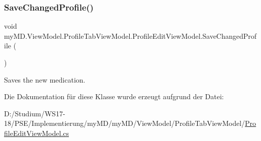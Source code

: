 \subsubsection{\texorpdfstring{Save\+Changed\+Profile()}{SaveChangedProfile()}}
{\footnotesize\ttfamily void my\+M\+D.\+View\+Model.\+Profile\+Tab\+View\+Model.\+Profile\+Edit\+View\+Model.\+Save\+Changed\+Profile (\begin{DoxyParamCaption}{ }\end{DoxyParamCaption})}



Saves the new medication. 



Die Dokumentation für diese Klasse wurde erzeugt aufgrund der Datei\+:\begin{DoxyCompactItemize}
\item 
D\+:/\+Studium/\+W\+S17-\/18/\+P\+S\+E/\+Implementierung/my\+M\+D/my\+M\+D/\+View\+Model/\+Profile\+Tab\+View\+Model/\mbox{\hyperlink{_profile_edit_view_model_8cs}{Profile\+Edit\+View\+Model.\+cs}}\end{DoxyCompactItemize}
